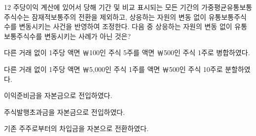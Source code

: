 \begin{question}{12}
주당이익 계산에 있어서 당해 기간 및 비교 표시되는 모든 기간의 가중평균유통보통주식수는 잠재적보통주의 전환을 제외하고, 상응하는 자원의 변동 없이 유통보통주식수를 변동시키는 사건을 반영하여 조정한다. 다음 중 상응하는 자원의 변동 없이 유통보통주식수를 변동시키는 사례가 아닌 것은?
\begin{choices}
  \item 다른 거래 없이 1주당 액면 ￦100인 주식 5주를 액면 ￦500인 주식 1주로 병합하였다.
  \item 다른 거래 없이 1주당 액면 ￦5,000인 주식 1주를 액면 ￦500인 주식 10주로 분할하였다.
  \item 이익준비금을 자본금으로 전입하였다.
  \item 주식발행초과금을 자본금으로 전입하였다.
  \item 기존 주주로부터의 차입금을 자본으로 전환하였다.
\end{choices}
\end{question}
